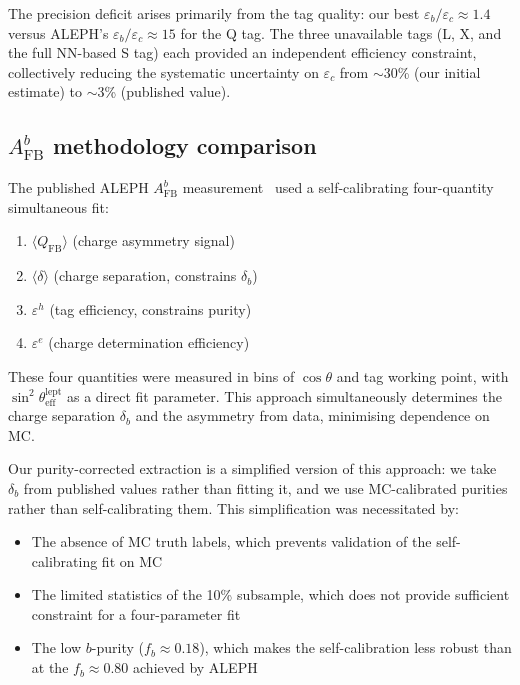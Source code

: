\documentclass[11pt,a4paper]{article}
\begin{document}
The precision deficit arises primarily from the tag quality:
our best $\varepsilon_b/\varepsilon_c \approx 1.4$ versus
ALEPH's $\varepsilon_b/\varepsilon_c \approx 15$ for the Q tag.
The three unavailable tags (L, X, and the full NN-based S tag)
each provided an independent efficiency constraint, collectively
reducing the systematic uncertainty on $\varepsilon_c$ from
$\sim$30\% (our initial estimate) to $\sim$3\% (published value).

\subsection{$A_\text{FB}^b$ methodology comparison}
\label{sec:method:afb}

The published ALEPH $A_\text{FB}^b$ measurement~\cite{ALEPH:AFBb}
used a self-calibrating four-quantity simultaneous fit:
\begin{enumerate}
\item $\langle Q_\text{FB}\rangle$ (charge asymmetry signal)
\item $\langle\delta\rangle$ (charge separation, constrains $\delta_b$)
\item $\varepsilon^h$ (tag efficiency, constrains purity)
\item $\varepsilon^e$ (charge determination efficiency)
\end{enumerate}
These four quantities were measured in bins of $\cos\theta$ and
tag working point, with $\sin^2\theta_\text{eff}^\text{lept}$ as
a direct fit parameter.
This approach simultaneously determines the charge separation
$\delta_b$ and the asymmetry from data, minimising dependence on
MC.

Our purity-corrected extraction is a simplified version of this
approach: we take $\delta_b$ from published values rather than
fitting it, and we use MC-calibrated purities rather than
self-calibrating them.
This simplification was necessitated by:
\begin{itemize}
\item The absence of MC truth labels, which prevents validation
  of the self-calibrating fit on MC
\item The limited statistics of the 10\% subsample, which does
  not provide sufficient constraint for a four-parameter fit
\item The low $b$-purity ($f_b \approx 0.18$), which makes the
  self-calibration less robust than at the $f_b \approx 0.80$
  achieved by ALEPH
\end{itemize}
\end{document}

